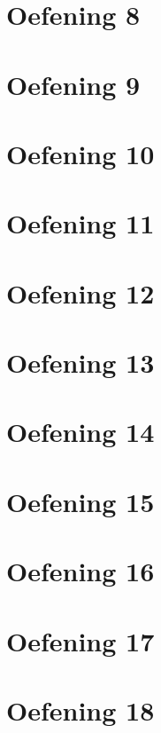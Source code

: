 \documentclass[a4paper,11pt]{report}
\begin{document}
\section{Oefening 8}

\section{Oefening 9}

\section{Oefening 10}

\section{Oefening 11}

\section{Oefening 12}

\section{Oefening 13}

\section{Oefening 14}

\section{Oefening 15}

\section{Oefening 16}

\section{Oefening 17}

\section{Oefening 18}


\newpage
\end{document}
